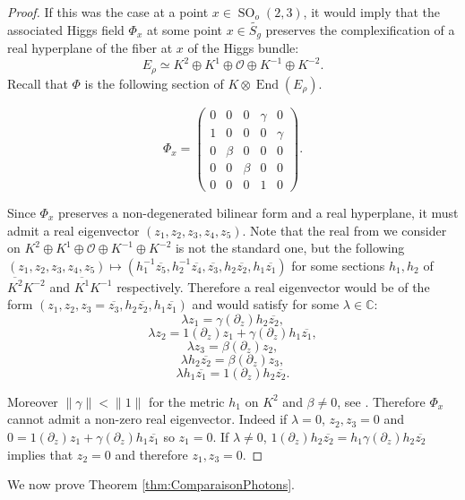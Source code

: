 \documentclass[reqno,10pt]{amsart}
\theoremstyle{plain}
\theoremstyle{definition}
\theoremstyle{remark}
\newcommand{\C}{\mathbb{C}}
\DeclareMathOperator{\End}{End}
\DeclareMathOperator{\SO}{SO}
\begin{document}
\begin{proof}
If this was the case at a point $x\in \SO_o(2,3)$, it would imply that the associated Higgs field $\Phi_x$ at some point $x\in \widetilde{S_g}$ preserves the complexification of a real hyperplane of the fiber at $x$ of the Higgs bundle:
 $$E_\rho\simeq K^2\oplus K^1\oplus \mathcal{O}\oplus K^{-1}\oplus K^{-2}.$$
Recall that $\Phi$ is the following section of $K\otimes\End\left(E_\rho\right)$.

$$\Phi_x=\begin{pmatrix}
0& 0 & 0& \gamma& 0 \\
1 & 0 & 0& 0& \gamma  \\
0& \beta & 0&0 & 0  \\
 0& 0 &\beta&0 &0  \\
  0&0    & 0& 1&0 \end{pmatrix}.$$
  
Since $\Phi_x$ preserves a non-degenerated bilinear form and a real hyperplane, it must admit a real eigenvector $(z_1,z_2,z_3,z_4,z_5)$.
Note that the real from we consider on $K^2\oplus K^1\oplus \mathcal{O}\oplus K^{-1}\oplus K^{-2}$ is not the standard one, but the following
$(z_1,z_2,z_3,z_4,z_5)\mapsto (h_1^{-1}\overline{z_5},h_2^{-1}\overline{z_4},\overline{z_3},h_2\overline{z_2},h_1\overline{z_1})$ for some sections $h_1, h_2$ of $\overline{K^2}K^{-2}$ and  $\overline{K^1}K^{-1}$ respectively. Therefore a real eigenvector would be of the form $(z_1,z_2,z_3=\overline{z_3}, h_2\overline{z_2}, h_1\overline{z_1})$ and would satisfy for some $\lambda\in \C$:
$$\lambda z_1=\gamma(\partial_z) h_2\overline{z_2},$$
$$\lambda z_2=1(\partial_z)z_1+\gamma(\partial_z)h_1\overline{z_1},$$
$$\lambda z_3=\beta(\partial_z) z_2,$$
$$\lambda h_2\overline{z_2}=\beta(\partial_z) z_3 ,$$
$$\lambda h_1\overline{z_1}=1(\partial_z)h_2\overline{z_2} .$$

Moreover $\lVert\gamma\rVert<\lVert 1\rVert$ for the metric $h_1$ on $K^2$ and $\beta\neq 0$, see \cite[Section 4.3]{Collier_2019}. Therefore $\Phi_x$ cannot admit a non-zero real eigenvector. Indeed if $\lambda=0$, $z_2,z_3=0$ and $0=1(\partial_z)z_1+\gamma(\partial_z)h_1\overline{z_1}$ so $z_1=0$. If $\lambda\neq 0$, $1(\partial_z)h_2\overline{z_2}=h_1\gamma(\partial_z) h_2\overline{z_2}$ implies that $z_2=0$ and therefore $z_1,z_3=0$.

\end{proof}


We now prove Theorem \ref{thm:ComparaisonPhotons}.

\medskip
\end{document}
